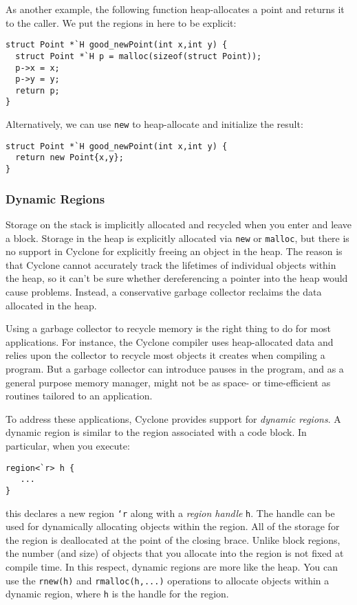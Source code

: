 As another example, the following function heap-allocates a point and
returns it to the caller.  We put the regions in here to be explicit:
\begin{verbatim}
struct Point *`H good_newPoint(int x,int y) {
  struct Point *`H p = malloc(sizeof(struct Point));
  p->x = x;
  p->y = y;
  return p;
}
\end{verbatim}
Alternatively, we can use \texttt{new} to heap-allocate and 
initialize the result:
\begin{verbatim}
struct Point *`H good_newPoint(int x,int y) {
  return new Point{x,y};
}
\end{verbatim}

\subsubsection*{Dynamic Regions}

Storage on the stack is implicitly allocated and recycled when you
enter and leave a block.  Storage in the heap is explicitly allocated
via \texttt{new} or \texttt{malloc}, but there is no support in
Cyclone for explicitly freeing an object in the heap.  The reason is
that Cyclone cannot accurately track the lifetimes of individual
objects within the heap, so it can't be sure whether dereferencing a
pointer into the heap would cause problems.  Instead, a conservative
garbage collector reclaims the data allocated in the heap.

Using a garbage collector to recycle memory is the right thing to do
for most applications.  For instance, the Cyclone compiler uses
heap-allocated data and relies upon the collector to recycle most
objects it creates when compiling a program. But a garbage collector
can introduce pauses in the program, and as a general purpose memory
manager, might not be as space- or time-efficient as routines tailored
to an application.

To address these applications, Cyclone provides support for \emph{dynamic
regions}.  A dynamic region is similar to the region associated with
a code block.  In particular, when you execute:
\begin{verbatim}
region<`r> h {
   ...
}
\end{verbatim}
this declares a new region \texttt{`r} along with a \emph{region handle}
\texttt{h}.  The handle can be used for dynamically allocating objects within
the region.  All of the storage for
the region is deallocated at the point of the closing brace.  
Unlike block
regions, the number (and size) of objects that you allocate into
the region is not fixed at compile time.  In this respect, dynamic
regions are more like the heap.  You can use the \texttt{rnew(h)} and
\texttt{rmalloc(h,...)} operations to allocate objects within a dynamic
region, where \texttt{h} is the handle for the region.
 
